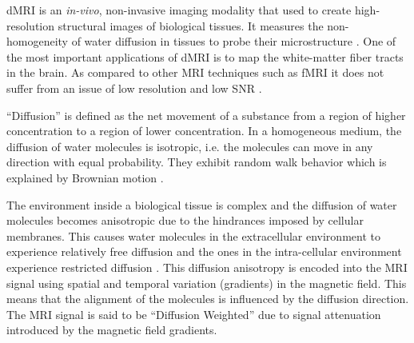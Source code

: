 \documentclass[msthesis.tex]{subfiles}
\begin{document}
\gls{dMRI} is an \textit{in-vivo}, non-invasive imaging modality that used to create high-resolution structural images of biological tissues. It measures the non-homogeneity of water diffusion in tissues to probe their microstructure \citep{ghosh2015survey}. One of the most important applications of \gls{dMRI} is to map the white-matter fiber tracts in the brain. As compared to other \gls{MRI} techniques such as \gls{fMRI} it does not suffer from an issue of low resolution and low \gls{SNR} \citep{wong2016}. 

``Diffusion'' is defined as the net movement of a substance from a region of higher concentration to a region of lower concentration. In a homogeneous medium, the diffusion of water molecules is isotropic, i.e. the molecules can move in any direction with equal probability. They exhibit random walk behavior which is explained by Brownian motion \citep{Brogioli_2000}.

The environment inside a biological tissue is complex and the diffusion of water molecules becomes anisotropic due to the hindrances imposed by cellular membranes. This causes water molecules in the extracellular environment to experience relatively free diffusion and the ones in the intra-cellular environment experience restricted diffusion \citep{toennies2017guide}. This diffusion anisotropy is encoded into the MRI signal using spatial and temporal variation (gradients) in the magnetic field. This means that the alignment of the molecules is influenced by the diffusion direction. The \gls{MRI} signal is said to be ``Diffusion Weighted'' due to signal attenuation introduced by the magnetic field gradients. 
\end{document}
